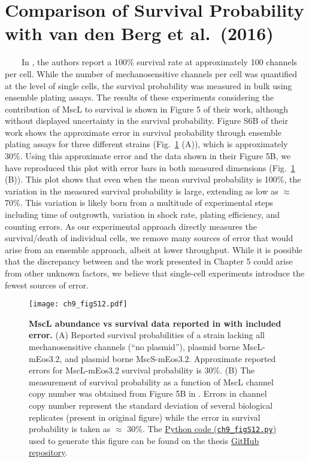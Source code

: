 \documentclass[12pt]{caltech_thesis}
\begin{document}
\hypertarget{comparison-of-survival-probability-with-van-den-berg-et-al.-2016}{%
\section{Comparison of Survival Probability with van den Berg et
al.~(2016)}\label{comparison-of-survival-probability-with-van-den-berg-et-al.-2016}}

~~~~In \textcite{vandenberg2016}, the authors report a 100\% survival
rate at approximately 100 channels per cell. While the number of
mechanosensitive channels per cell was quantified at the level of single
cells, the survival probability was measured in bulk using ensemble
plating assays. The results of these experiments considering the
contribution of MscL to survival is shown in Figure 5 of their work,
although without displayed uncertainty in the survival probability.
Figure S6B of their work shows the approximate error in survival
probability through ensemble plating assays for three different strains
(Fig.~\ref{fig:poolman_comparison} (A)), which is approximately 30\%.
Using this approximate error and the data shown in their Figure 5B, we
have reproduced this plot with error bars in both measured dimensions
(Fig.~\ref{fig:poolman_comparison} (B)). This plot shows that even when
the mean survival probability is 100\%, the variation in the measured
survival probability is large, extending as low as \(\approx\) 70\%.
This variation is likely born from a multitude of experimental steps
including time of outgrowth, variation in shock rate, plating
efficiency, and counting errors. As our experimental approach directly
measures the survival/death of individual cells, we remove many sources
of error that would arise from an ensemble approach, albeit at lower
throughput. While it is possible that the discrepancy between
\textcite{vandenberg2016} and the work presented in Chapter 5 could
arise from other unknown factors, we believe that single-cell
experiments introduce the fewest sources of error.

\hypertarget{fig:poolman_comparison}{%
\begin{figure}
\centering
\texttt{[image: ch9\_figS12.pdf]}
\caption[{MscL abundance versus survival data reported in van den Berg
et al. 2016 with included error.}]{\textbf{MscL abundance vs survival
data reported in \textcite{vandenberg2016} with included error.} (A)
Reported survival probabilities of a strain lacking all mechanosensitive
channels (``no plasmid''), plasmid borne MscL-mEos3.2, and plasmid borne
MscS-mEos3.2. Approximate reported errors for MscL-mEos3.2 survival
probability is 30\%. (B) The measurement of survival probability as a
function of MscL channel copy number was obtained from Figure 5B in
\textcite{vandenberg2016}. Errors in channel copy number represent the
standard deviation of several biological replicates (present in original
figure) while the error in survival probability is taken as \(\approx\)
30\%. The
\href{https://github.com/gchure/phd/blob/master/src/chapter_09/code/ch9_figS12.py}{Python
code (\texttt{ch9\_figS12.py})} used to generate this figure can be
found on the thesis \href{https://github.com/gchure/phd}{GitHub
repository}.}
\label{fig:poolman_comparison}
\end{figure}
}
\end{document}
